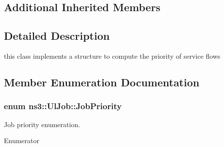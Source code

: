 \subsection*{Additional Inherited Members}


\subsection{Detailed Description}
this class implements a structure to compute the priority of service flows 

\subsection{Member Enumeration Documentation}
\subsubsection[{\texorpdfstring{Job\+Priority}{JobPriority}}]{\setlength{\rightskip}{0pt plus 5cm}enum {\bf ns3\+::\+Ul\+Job\+::\+Job\+Priority}}\hypertarget{classns3_1_1UlJob_a6ae1d8e2e490a32ee1bc8aae661f4983}{}\label{classns3_1_1UlJob_a6ae1d8e2e490a32ee1bc8aae661f4983}


Job priority enumeration. 

\begin{Desc}
\item[Enumerator]\par
\begin{description}
\item[{\em 
L\+OW\hypertarget{classns3_1_1UlJob_a6ae1d8e2e490a32ee1bc8aae661f4983a092c552c374d3aecff410695b003d49d}{}\label{classns3_1_1UlJob_a6ae1d8e2e490a32ee1bc8aae661f4983a092c552c374d3aecff410695b003d49d}
}]\item[{\em 
I\+N\+T\+E\+R\+M\+E\+D\+I\+A\+TE\hypertarget{classns3_1_1UlJob_a6ae1d8e2e490a32ee1bc8aae661f4983a3619db7d63201ac367a111b38e443eea}{}\label{classns3_1_1UlJob_a6ae1d8e2e490a32ee1bc8aae661f4983a3619db7d63201ac367a111b38e443eea}
}]\item[{\em 
H\+I\+GH\hypertarget{classns3_1_1UlJob_a6ae1d8e2e490a32ee1bc8aae661f4983a5094609e73e947663a497fd927ce562e}{}\label{classns3_1_1UlJob_a6ae1d8e2e490a32ee1bc8aae661f4983a5094609e73e947663a497fd927ce562e}
}]\end{description}
\end{Desc}

